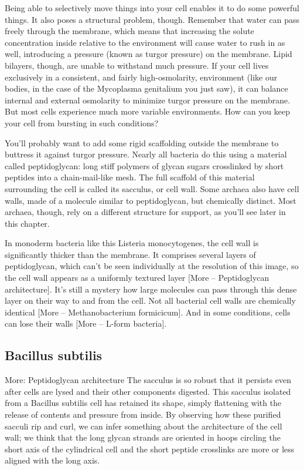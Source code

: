 \documentclass[]{tufte-book}
\begin{document}
Being able to selectively move things into your cell enables it to do
some powerful things. It also poses a structural problem, though.
Remember that water can pass freely through the membrane, which means
that increasing the solute concentration inside relative to the
environment will cause water to rush in as well, introducing a pressure
(known as turgor pressure) on the membrane. Lipid bilayers, though, are
unable to withstand much pressure. If your cell lives exclusively in a
consistent, and fairly high-osmolarity, environment (like our bodies, in
the case of the Mycoplasma genitalium you just saw), it can balance
internal and external osmolarity to minimize turgor pressure on the
membrane. But most cells experience much more variable environments. How
can you keep your cell from bursting in such conditions?

You'll probably want to add some rigid scaffolding outside the membrane
to buttress it against turgor pressure. Nearly all bacteria do this
using a material called peptidoglycan: long stiff polymers of glycan
sugars crosslinked by short peptides into a chain-mail-like mesh. The
full scaffold of this material surrounding the cell is called its
sacculus, or cell wall. Some archaea also have cell walls, made of a
molecule similar to peptidoglycan, but chemically distinct. Most
archaea, though, rely on a different structure for support, as you'll
see later in this chapter.

In monoderm bacteria like this Listeria monocytogenes, the cell wall is
significantly thicker than the membrane. It comprises several layers of
peptidoglycan, which can't be seen individually at the resolution of
this image, so the cell wall appears as a uniformly textured layer
{[}More -- Peptidoglycan architecture{]}. It's still a mystery how large
molecules can pass through this dense layer on their way to and from the
cell. Not all bacterial cell walls are chemically identical {[}More --
Methanobacterium formicicum{]}. And in some conditions, cells can lose
their walls {[}More -- L-form bacteria{]}.

\subsection{Bacillus subtilis}\label{bacillus-subtilis}

More: Peptidoglycan architecture The sacculus is so robust that it
persists even after cells are lysed and their other components digested.
This sacculus isolated from a Bacillus subtilis cell has retained its
shape, simply flattening with the release of contents and pressure from
inside. By observing how these purified sacculi rip and curl, we can
infer something about the architecture of the cell wall; we think that
the long glycan strands are oriented in hoops circling the short axis of
the cylindrical cell and the short peptide crosslinks are more or less
aligned with the long axis.
\end{document}
